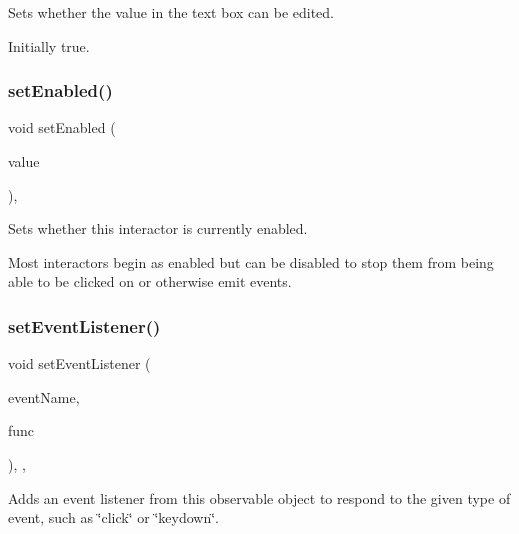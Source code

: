 Sets whether the value in the text box can be edited. 

Initially true. \mbox{\label{classGInteractor_ab831367dd84bbd579e02e55bacb21343}} 
\subsubsection{\texorpdfstring{set\+Enabled()}{setEnabled()}}
{\footnotesize\ttfamily void set\+Enabled (\begin{DoxyParamCaption}\item[{bool}]{value }\end{DoxyParamCaption})\hspace{0.3cm}{\ttfamily [virtual]}, {\ttfamily [inherited]}}



Sets whether this interactor is currently enabled. 

Most interactors begin as enabled but can be disabled to stop them from being able to be clicked on or otherwise emit events. \mbox{\label{classGObservable_ad2f6d34961c50f6c1e0659990b79f741}} 
\subsubsection{\texorpdfstring{set\+Event\+Listener()}{setEventListener()}\hspace{0.1cm}{\footnotesize\ttfamily [1/2]}}
{\footnotesize\ttfamily void set\+Event\+Listener (\begin{DoxyParamCaption}\item[{const std\+::string \&}]{event\+Name,  }\item[{G\+Event\+Listener}]{func }\end{DoxyParamCaption})\hspace{0.3cm}{\ttfamily [protected]}, {\ttfamily [virtual]}, {\ttfamily [inherited]}}



Adds an event listener from this observable object to respond to the given type of event, such as \char`\"{}click\char`\"{} or \char`\"{}keydown\char`\"{}. 

